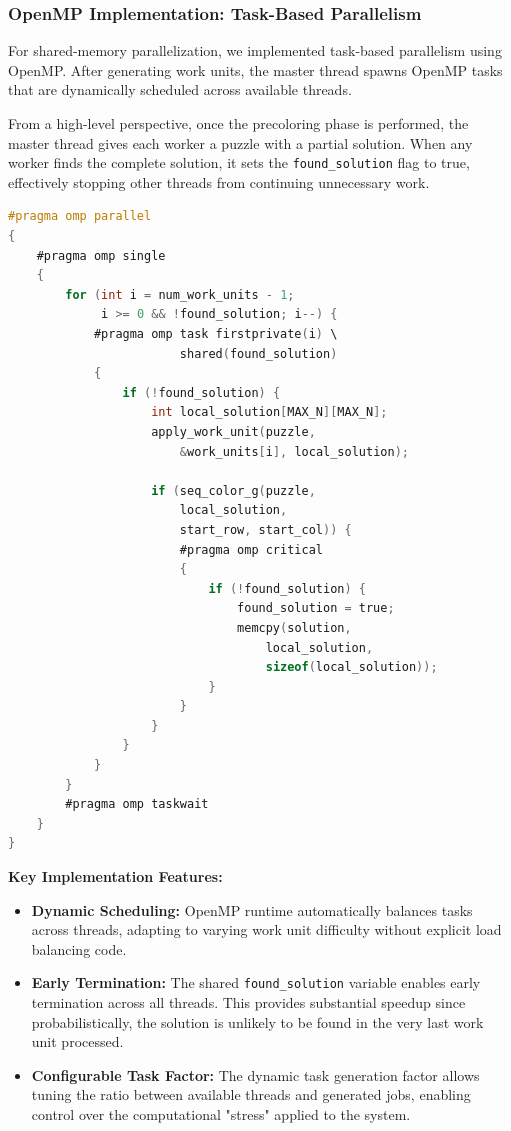 \begin{enumerate}
\subsubsection{OpenMP Implementation: Task-Based Parallelism}
\label{subsubsec:omp_implementation}
For shared-memory parallelization, we implemented task-based parallelism using OpenMP. After generating work units, the master thread spawns OpenMP tasks that are dynamically scheduled across available threads.

From a high-level perspective, once the precoloring phase is performed, the master thread gives each worker a puzzle with a partial solution. When any worker finds the complete solution, it sets the \texttt{found\_solution} flag to true, effectively stopping other threads from continuing unnecessary work.

\begin{lstlisting}[language=C, caption=OpenMP task-based implementation, label={listing:omp_implementation}]
#pragma omp parallel
{
    #pragma omp single
    {
        for (int i = num_work_units - 1; 
             i >= 0 && !found_solution; i--) {
            #pragma omp task firstprivate(i) \
                        shared(found_solution)
            {
                if (!found_solution) {
                    int local_solution[MAX_N][MAX_N];
                    apply_work_unit(puzzle, 
                        &work_units[i], local_solution);
                    
                    if (seq_color_g(puzzle, 
                        local_solution, 
                        start_row, start_col)) {
                        #pragma omp critical
                        {
                            if (!found_solution) {
                                found_solution = true;
                                memcpy(solution, 
                                    local_solution, 
                                    sizeof(local_solution));
                            }
                        }
                    }
                }
            }
        }
        #pragma omp taskwait
    }
}
\end{lstlisting}

\textbf{Key Implementation Features:}
\begin{itemize}
    \item \textbf{Dynamic Scheduling:} OpenMP runtime automatically balances tasks across threads, adapting to varying work unit difficulty without explicit load balancing code.
    \item \textbf{Early Termination:} The shared \texttt{found\_solution} variable enables early termination across all threads. This provides substantial speedup since probabilistically, the solution is unlikely to be found in the very last work unit processed.
    \item \textbf{Configurable Task Factor:} The dynamic task generation factor allows tuning the ratio between available threads and generated jobs, enabling control over the computational "stress" applied to the system.
\end{itemize}


\end{enumerate}
